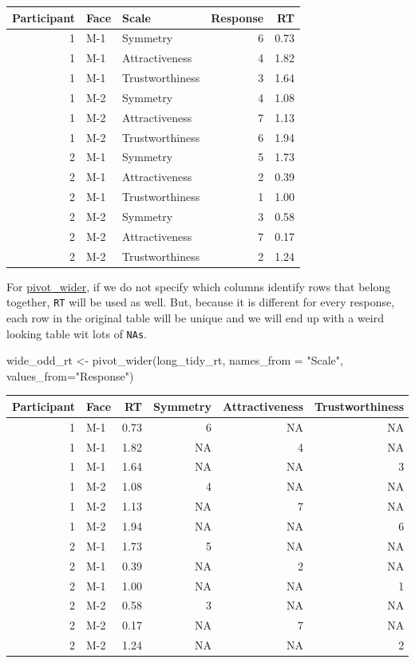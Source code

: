 \documentclass[
]{book}
\newenvironment{Shaded}{\begin{snugshade}}{\end{snugshade}}
\newcommand{\AttributeTok}[1]{\textcolor[rgb]{0.77,0.63,0.00}{#1}}
\newcommand{\FunctionTok}[1]{\textcolor[rgb]{0.00,0.00,0.00}{#1}}
\newcommand{\NormalTok}[1]{#1}
\newcommand{\OtherTok}[1]{\textcolor[rgb]{0.56,0.35,0.01}{#1}}
\newcommand{\StringTok}[1]{\textcolor[rgb]{0.31,0.60,0.02}{#1}}
\begin{document}
\begin{tabular}{r|l|l|r|r}
\hline
Participant & Face & Scale & Response & RT\\
\hline
1 & M-1 & Symmetry & 6 & 0.73\\
\hline
1 & M-1 & Attractiveness & 4 & 1.82\\
\hline
1 & M-1 & Trustworthiness & 3 & 1.64\\
\hline
1 & M-2 & Symmetry & 4 & 1.08\\
\hline
1 & M-2 & Attractiveness & 7 & 1.13\\
\hline
1 & M-2 & Trustworthiness & 6 & 1.94\\
\hline
2 & M-1 & Symmetry & 5 & 1.73\\
\hline
2 & M-1 & Attractiveness & 2 & 0.39\\
\hline
2 & M-1 & Trustworthiness & 1 & 1.00\\
\hline
2 & M-2 & Symmetry & 3 & 0.58\\
\hline
2 & M-2 & Attractiveness & 7 & 0.17\\
\hline
2 & M-2 & Trustworthiness & 2 & 1.24\\
\hline
\end{tabular}

For \href{https://tidyr.tidyverse.org/reference/pivot_wider.html}{pivot\_wider}, if we do not specify which columns identify rows that belong together, \texttt{RT} will be used as well. But, because it is different for every response, each row in the original table will be unique and we will end up with a weird looking table wit lots of \texttt{NAs}.

\begin{Shaded}
\begin{Highlighting}[]
\NormalTok{wide\_odd\_rt }\OtherTok{\textless{}{-}}
  \FunctionTok{pivot\_wider}\NormalTok{(long\_tidy\_rt, }\AttributeTok{names\_from =} \StringTok{"Scale"}\NormalTok{, }\AttributeTok{values\_from=}\StringTok{"Response"}\NormalTok{)}
\end{Highlighting}
\end{Shaded}

\begin{tabular}{r|l|r|r|r|r}
\hline
Participant & Face & RT & Symmetry & Attractiveness & Trustworthiness\\
\hline
1 & M-1 & 0.73 & 6 & NA & NA\\
\hline
1 & M-1 & 1.82 & NA & 4 & NA\\
\hline
1 & M-1 & 1.64 & NA & NA & 3\\
\hline
1 & M-2 & 1.08 & 4 & NA & NA\\
\hline
1 & M-2 & 1.13 & NA & 7 & NA\\
\hline
1 & M-2 & 1.94 & NA & NA & 6\\
\hline
2 & M-1 & 1.73 & 5 & NA & NA\\
\hline
2 & M-1 & 0.39 & NA & 2 & NA\\
\hline
2 & M-1 & 1.00 & NA & NA & 1\\
\hline
2 & M-2 & 0.58 & 3 & NA & NA\\
\hline
2 & M-2 & 0.17 & NA & 7 & NA\\
\hline
2 & M-2 & 1.24 & NA & NA & 2\\
\hline
\end{tabular}
\end{document}
